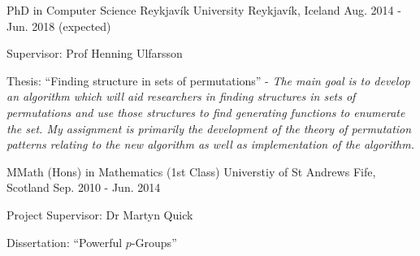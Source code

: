 


\begin{cventries}


  \cventry
  {PhD in Computer Science} %
  {Reykjavík University} %
  {Reykjavík, Iceland} %
  {Aug. 2014 - Jun. 2018 (expected)} %
  {
    \begin{cvitems} %
      \item {
      Supervisor: Prof Henning Ulfarsson
      }
      \item {
      Thesis: ``Finding structure in sets of permutations'' -
      \textit{The main goal is to develop an algorithm which will aid
      researchers in finding structures in sets of permutations and use those
      structures to find generating functions to enumerate the set. My
      assignment is primarily the development of the theory of permutation
      patterns relating to the new algorithm as well as implementation of the
      algorithm.}
      }
    \end{cvitems}
  }


  \cventry
    {MMath (Hons) in Mathematics (1st Class)} %
    {Universtiy of St Andrews} %
    {Fife, Scotland} %
    {Sep. 2010 - Jun. 2014} %
    {
      \begin{cvitems} %
        \item {
        Project Supervisor: Dr Martyn Quick
        }
        \item {
        Dissertation: ``Powerful $p$-Groups'' }
      \end{cvitems}
    }

\end{cventries}
